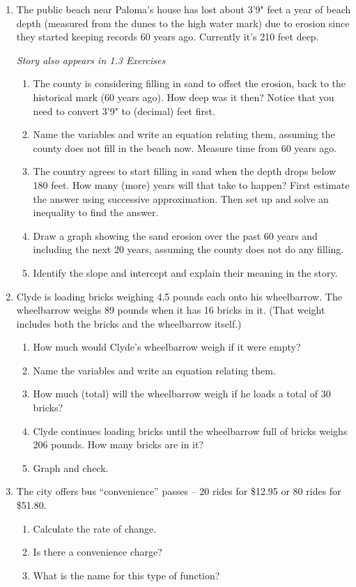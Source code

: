\begin{enumerate}
\item The public beach near Paloma's house has lost about 3'9" feet a year of beach depth (measured from the dunes to the high water mark) due to erosion since they started keeping records 60 years ago.  Currently it's 210 feet deep.    

\hfill \emph{Story also appears in 1.3 Exercises}
\begin{enumerate}
\item The county is considering filling in sand to offset the erosion, back to the historical mark (60 years ago).  How deep was it then? Notice that you need to convert 3'9" to (decimal) feet first.
\item Name the variables and write an equation relating them, assuming the county does not fill in the beach now.  Measure time from 60 years ago.
\item  The country agrees to start filling in sand when the depth drops below 180 feet.  How many (more) years will that take to happen?  First estimate the answer using successive approximation.  Then set up and solve an inequality to find the answer.
\item Draw a graph showing the sand erosion over the past 60 years and including the next 20 years, assuming the county does not do any filling.
\item Identify the slope and intercept and explain their meaning in the story.
\end{enumerate}  

\item Clyde is loading bricks weighing 4.5 pounds each onto his wheelbarrow.  The wheelbarrow weighs 89 pounds when it has 16 bricks in it. (That weight includes both the bricks and the wheelbarrow itself.)
\begin{enumerate}
\item How much would Clyde's wheelbarrow weigh if it were empty?
\item Name the variables and write an equation relating them.
\item How much (total) will the wheelbarrow weigh if he loads a total of 30 bricks?
\item Clyde continues loading bricks until the wheelbarrow full of bricks weighs 206 pounds.  How many bricks are in it?
\item Graph and check.
\end{enumerate}

\item The city offers bus ``convenience'' passes -- 20 rides for \$12.95 or 80 rides for \$51.80.  
\begin{enumerate}
\item Calculate the rate of change.
\item Is there a convenience charge?
\item What is the name for this type of function?
\end{enumerate}


\end{enumerate}
